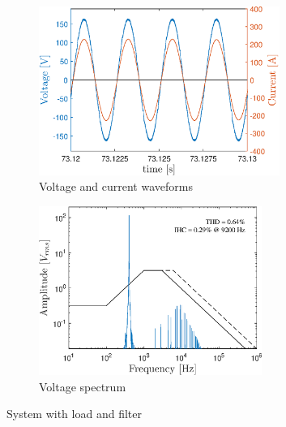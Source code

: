 \begin{doublespacing}
\begin{figure}[!htb] %
	\centering
	\begin{subfigure}[b]{0.5\textwidth}
		\centering
		\includegraphics[height=5.5cm]{Figures/artigo_filt_3.eps}
		\caption{Voltage and current waveforms} 
		\label{fig:artigo_filt_3.eps}
	\end{subfigure}%
	\hfill
	\begin{subfigure}[b]{0.5\textwidth}  
		\centering 
		\includegraphics[height=5.5cm]{Figures/artigo_filt_4.eps}
		\caption{Voltage spectrum}    
		\label{fig:artigo_filt_4.eps}
	\end{subfigure}%
	\caption{System with load and filter}
	\label{fig:4}
\end{figure}

\end{doublespacing}